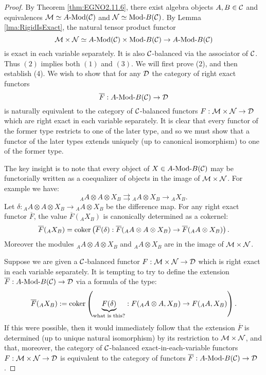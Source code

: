 \documentclass{amsart}
\begin{document}
\begin{proof}
	 By Theorem \ref{thm:EGNO2.11.6}, there exist algebra objects $A, B \in \mathcal C$ and equivalences $\cM \simeq \Mod{A}{}(\cC)$ and $\cN \simeq \Mod{}{B}(\cC)$. By Lemma \ref{lma:RigidIsExact}, the natural tensor product functor
	\begin{equation*}
		\cM \times \cN \simeq \Mod{A}{}(\cC) \times  \Mod{}{B}(\cC) \to \Mod{A}{B}(\cC)
	\end{equation*}
	is exact in each variable separately. It is also $\mathcal C$-balanced via the associator of $\mathcal C$. Thus $(2)$ implies both  $(1)$ and $(3)$. We will first prove (2), and then establish (4).  We wish to show that for any $\mathcal D$ the category of right exact functors 
\begin{equation*}
	\overline{F}:\Mod{A}{B}(\cC) \to \cD
\end{equation*}
	is naturally equivalent to the category of $\mathcal C$-balanced functors $F:\mathcal M \times \mathcal N \to \mathcal D$ which are right exact in each variable separately. It is clear that every functor of the former type restricts to one of the later type, and so we must show that a functor of the later types extends uniquely (up to canonical isomorphism) to one of the former type. 
	
The key insight is to note that every object of $X \in \Mod{A}{B}(\cC)$ may be functorially written as a coequalizer of objects in the image of $\mathcal M \times \mathcal N$. For example we have:
\begin{equation*}
	{}_A A \otimes A \otimes X_B \rightrightarrows {}_A A \otimes X_B \to {}_A X_B.
\end{equation*}
Let $\delta: {}_A A \otimes A \otimes X_B \to {}_A A \otimes X_B$ be the difference map. 
For any right exact functor $\overline{F}$, the value $\overline{F}({}_A X_B)$ is canonically determined as a cokernel:
\begin{equation*}
	\overline{F}({}_A X_B) = \operatorname*{coker} \left( \overline{F}(\delta): \overline{F}({}_A A \otimes A \otimes X_B) \to \overline{F}({}_A A \otimes X_B) \right).
\end{equation*} 
Moreover the modules ${}_A A \otimes A \otimes X_B$ and ${}_A A \otimes X_B$ are in the image of $\mathcal M \times \mathcal N$. 
	
Suppose we are given a $\mathcal C$-balanced functor $F:\mathcal M \times \mathcal N \to \mathcal D$ which is right exact in each variable separately. It is tempting to try to define the extension $\overline{F}: \Mod{A}{B}(\cC) \to \cD$ via a formula of the type:
\begin{equation*}
	\overline{F}({}_A X_B) := \operatorname*{coker} \left( \underbrace{{F}(\delta)}_{\textrm{what is this?}}: F({}_A A \otimes A,  X_B) \to {F}({}_A A , X_B) \right).
\end{equation*} 
If this were possible, then it would immediately follow that the extension $\overline{F}$ is determined (up to unique natural isomorphism) by its restriction to $\mathcal M \times \mathcal N$, and that, moreover, the category of $\mathcal C$-balanced exact-in-each-variable functors $F:\mathcal M \times \mathcal N \to \mathcal D$ is equivalent to the category of functors  
$\overline{F}: \Mod{A}{B}(\cC) \to \cD$.


\end{proof}
\end{document}

